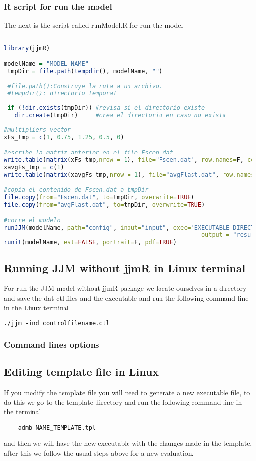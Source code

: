 \documentclass{article}
\begin{document}
\subsubsection{R script for run the model}
The next is the script called runModel.R for run the model 
\begin{lstlisting}[language=R]

library(jjmR)

modelName = "MODEL_NAME"
 tmpDir = file.path(tempdir(), modelName, "")
 
 #file.path():Construye la ruta a un archivo.
 #tempdir(): directorio temporal
 
 if (!dir.exists(tmpDir)) #revisa si el directorio existe
   dir.create(tmpDir)     #crea el directorio en caso no exista
   
#multipliers vector
xFs_tmp = c(1, 0.75, 1.25, 0.5, 0) 

#escribe la matriz anterior en el file Fscen.dat
write.table(matrix(xFs_tmp,nrow = 1), file="Fscen.dat", row.names=F, col.names=F) 
xavgFs_tmp = c(1) 
write.table(matrix(xavgFs_tmp,nrow = 1), file="avgFlast.dat", row.names=F, col.names=F)

#copia el contenido de Fscen.dat a tmpDir
file.copy(from="Fscen.dat", to=tmpDir, overwrite=TRUE) 
file.copy(from="avgFlast.dat", to=tmpDir, overwrite=TRUE)

#corre el modelo
runJJM(modelName, path="config", input="input", exec="EXECUTABLE_DIRECTORY", 
                                                        output = "results/")
runit(modelName, est=FALSE, portrait=F, pdf=TRUE)
\end{lstlisting}
\subsection{Running JJM without jjmR in Linux terminal}
For run the JJM model without jjmR package we locate ourselves in a directory and save the dat ctl files and the executable and run the following command line in the Linux terminal
\begin{lstlisting}
./jjm -ind controlfilename.ctl
\end{lstlisting}
\subsubsection{Command lines options}
\subsection{Editing template file in Linux}
If you modify the template file you will need to generate a new executable file, to do this we go to the template directory and run the following command line in the terminal
\begin{lstlisting}
    admb NAME_TEMPLATE.tpl 
    \end{lstlisting}
and then we will have the new executable with the changes made in the template, after this we follow the usual steps above for a new evaluation.
\end{document}

